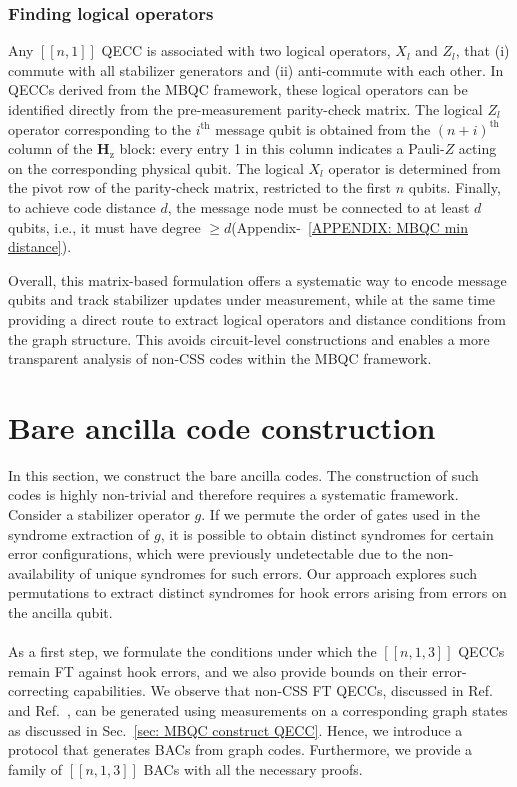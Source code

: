 \documentclass[reprint, amsmath,amssymb, aps,pra,
 floatfix,
]{revtex4-2}
\begin{document}
\noindent \subsubsection{\normalsize Finding logical operators}
\noindent Any $[[n,1]]$ QECC is associated with two logical operators, $X_l$ and $Z_l$, that (i) commute with all stabilizer generators and (ii) anti-commute with each other.
In QECCs derived from the MBQC framework, these logical operators can be identified directly from the pre-measurement parity-check matrix.
The logical $Z_l$ operator corresponding to the $i^\text{th}$ message qubit is obtained from the $(n+i)^\text{th}$ column of the $\mathbf{H}_\mathrm{z}$ block: every entry 1 in this column indicates a Pauli-$Z$ acting on the corresponding physical qubit.
The logical $X_l$ operator is determined from the pivot row of the parity-check matrix, restricted to the first $n$ qubits.
Finally, to achieve code distance $d$, the message node must be connected to at least $d$ qubits, i.e., it must have degree $\geq d$(Appendix-~\ref{APPENDIX: MBQC min distance}).

\noindent Overall, this matrix-based formulation offers a systematic way to encode message qubits and track stabilizer updates under measurement, while at the same time providing a direct route to extract logical operators and distance conditions from the graph structure.
This avoids circuit-level constructions and enables a more transparent analysis of non-CSS codes within the MBQC framework.
\section{Bare ancilla code construction}
\label{sec: Bare constrcution}

\noindent In this section, we construct the bare ancilla codes.
The construction of such codes is highly non-trivial and therefore requires a systematic framework.
Consider a stabilizer operator $g$.
If we permute the order of gates used in the syndrome extraction of $g$, it is possible to obtain distinct syndromes for certain error configurations, which were previously undetectable due to the non-availability of unique syndromes for such errors. 
Our approach explores such permutations to extract distinct syndromes for hook errors arising from errors on the ancilla qubit.\\\\
As a first step, we formulate the conditions under which the $[[n,1,3]]$ QECCs remain FT against hook errors, and we also provide bounds on their error-correcting capabilities.
We observe that non-CSS FT QECCs, discussed in Ref.~\cite{Muyuna} and Ref.~\cite{maheshwari2024fault}, can be generated using measurements on a corresponding graph states as discussed in Sec.~\ref{sec: MBQC construct QECC}.
Hence, we introduce a protocol that generates BACs from graph codes.
Furthermore, we provide a family of $[[n,1,3]]$ BACs with all the necessary proofs.
\end{document}
